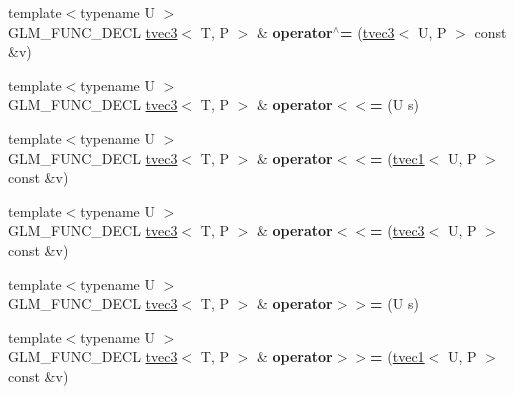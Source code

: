 \begin{DoxyCompactItemize}
\item 
\hypertarget{structglm_1_1tvec3_a31247f55bc34542e94c0928ad1c1e5e5}{{\footnotesize template$<$typename U $>$ }\\G\-L\-M\-\_\-\-F\-U\-N\-C\-\_\-\-D\-E\-C\-L \hyperlink{structglm_1_1tvec3}{tvec3}$<$ T, P $>$ \& {\bfseries operator$^\wedge$=} (\hyperlink{structglm_1_1tvec3}{tvec3}$<$ U, P $>$ const \&v)}\label{structglm_1_1tvec3_a31247f55bc34542e94c0928ad1c1e5e5}

\item 
\hypertarget{structglm_1_1tvec3_a483463451fa4b40e936ca5fc6ab1bf37}{{\footnotesize template$<$typename U $>$ }\\G\-L\-M\-\_\-\-F\-U\-N\-C\-\_\-\-D\-E\-C\-L \hyperlink{structglm_1_1tvec3}{tvec3}$<$ T, P $>$ \& {\bfseries operator$<$$<$=} (U s)}\label{structglm_1_1tvec3_a483463451fa4b40e936ca5fc6ab1bf37}

\item 
\hypertarget{structglm_1_1tvec3_af0d715a07138f9619ac7ee1924fa8940}{{\footnotesize template$<$typename U $>$ }\\G\-L\-M\-\_\-\-F\-U\-N\-C\-\_\-\-D\-E\-C\-L \hyperlink{structglm_1_1tvec3}{tvec3}$<$ T, P $>$ \& {\bfseries operator$<$$<$=} (\hyperlink{structglm_1_1tvec1}{tvec1}$<$ U, P $>$ const \&v)}\label{structglm_1_1tvec3_af0d715a07138f9619ac7ee1924fa8940}

\item 
\hypertarget{structglm_1_1tvec3_af05b4498d260dd9d784292b6a7873a80}{{\footnotesize template$<$typename U $>$ }\\G\-L\-M\-\_\-\-F\-U\-N\-C\-\_\-\-D\-E\-C\-L \hyperlink{structglm_1_1tvec3}{tvec3}$<$ T, P $>$ \& {\bfseries operator$<$$<$=} (\hyperlink{structglm_1_1tvec3}{tvec3}$<$ U, P $>$ const \&v)}\label{structglm_1_1tvec3_af05b4498d260dd9d784292b6a7873a80}

\item 
\hypertarget{structglm_1_1tvec3_aa4d5b8971a1fbef3132c1a52717dbf98}{{\footnotesize template$<$typename U $>$ }\\G\-L\-M\-\_\-\-F\-U\-N\-C\-\_\-\-D\-E\-C\-L \hyperlink{structglm_1_1tvec3}{tvec3}$<$ T, P $>$ \& {\bfseries operator$>$$>$=} (U s)}\label{structglm_1_1tvec3_aa4d5b8971a1fbef3132c1a52717dbf98}

\item 
\hypertarget{structglm_1_1tvec3_a7cb73c7e9a6756532e450515bc7f67ec}{{\footnotesize template$<$typename U $>$ }\\G\-L\-M\-\_\-\-F\-U\-N\-C\-\_\-\-D\-E\-C\-L \hyperlink{structglm_1_1tvec3}{tvec3}$<$ T, P $>$ \& {\bfseries operator$>$$>$=} (\hyperlink{structglm_1_1tvec1}{tvec1}$<$ U, P $>$ const \&v)}\label{structglm_1_1tvec3_a7cb73c7e9a6756532e450515bc7f67ec}


\end{DoxyCompactItemize}

